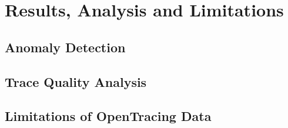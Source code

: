 \glsresetall
\chapter{Results, Analysis and Limitations}
\label{chap:results_analysis_and_limitations}


\section{Anomaly Detection}
\label{sec:anomaly_detection}


\section{Trace Quality Analysis}
\label{sec:trace_quality_analysis}


%

\section{Limitations of OpenTracing Data}
\label{sec:limitations_of_opentracing_data}


\checkoddpage
{}
{ %
\newpage
\blankpage}
{ %
}
